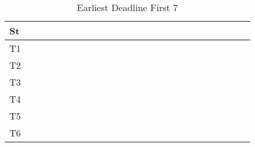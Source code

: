 \documentclass[xcolor=table]{beamer}
\begin{document}
\begin{frame}
\begin{table}
{\begin{tabular}{|l|l|l|l|l|l|l|l|l|l|l|l|l|l|l|l|l|l|l|l|l|l|l|l|l|}
\hline 
St &  \cellcolor{green} &  \cellcolor{green} &  \cellcolor{green} &  \cellcolor{green} &  \cellcolor{green} &  \cellcolor{green} &  \cellcolor{green} &  \cellcolor{green} &  \cellcolor{green} &  \cellcolor{green} &  \cellcolor{green} &  \cellcolor{green} &  \cellcolor{green} &  \cellcolor{green} &  \cellcolor{green} &  \cellcolor{green} &  \cellcolor{green} &  \cellcolor{green} &  \cellcolor{green} &  \cellcolor{green} &  \cellcolor{green} &  \cellcolor{green} &  \cellcolor{green} &  \cellcolor{green} \\ \hline 
T1 & & & & & & & & & & & & & & & & & & & & & & & & \\ \hline 
T2 & & & & & & & & & & & & & & & & & & & & & & & & \\ \hline 
T3 & \cellcolor{cyan} & \cellcolor{cyan} & \cellcolor{cyan} & \cellcolor{cyan} & \cellcolor{cyan} & \cellcolor{cyan} & \cellcolor{cyan} & \cellcolor{cyan} & \cellcolor{cyan} & \cellcolor{cyan} & \cellcolor{cyan} & \cellcolor{cyan} & \cellcolor{cyan} & \cellcolor{cyan} & \cellcolor{cyan} & \cellcolor{cyan} & \cellcolor{cyan} & \cellcolor{cyan} & \cellcolor{cyan} & \cellcolor{cyan} & \cellcolor{cyan} & \cellcolor{cyan} & \cellcolor{cyan} & \cellcolor{cyan} \\ \hline 
T4 & & & & & & & & & & & & & & & & & & & & & & & & \\ \hline 
T5 & & & & & & & & & & & & & & & & & & & & & & & & \\ \hline 
T6 & & & & & & & & & & & & & & & & & & & & & & & & \\ \hline 
\end{tabular} 
} 
\caption{ Earliest Deadline First 7 } 
\end{table} 
\begin{table} 
\centering 
{}
\end{table}
\end{frame}
\end{document}
